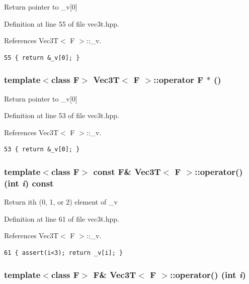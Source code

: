 Return pointer to \_\-v[0] 

Definition at line 55 of file vec3t.hpp.

References Vec3T$<$ F $>$::\_\-v.

\footnotesize\begin{verbatim}55 { return &_v[0]; }
\end{verbatim}\normalsize 


\subsubsection{\setlength{\rightskip}{0pt plus 5cm}template$<$class F$>$ {\bf Vec3T}$<$ F $>$::operator F $\ast$ ()\hspace{0.3cm}{\tt  [inline]}}\label{classVec3T_ac352e6903287f8c15cc49407e292610_ac352e6903287f8c15cc49407e292610}


Return pointer to \_\-v[0] 

Definition at line 53 of file vec3t.hpp.

References Vec3T$<$ F $>$::\_\-v.

\footnotesize\begin{verbatim}53 { return &_v[0]; }
\end{verbatim}\normalsize 


\subsubsection{\setlength{\rightskip}{0pt plus 5cm}template$<$class F$>$ const F\& {\bf Vec3T}$<$ F $>$::operator() (int {\em i}) const\hspace{0.3cm}{\tt  [inline]}}\label{classVec3T_46442ed0ae535217a90cc5b4b63a1f44_46442ed0ae535217a90cc5b4b63a1f44}


Return ith (0, 1, or 2) element of \_\-v 

Definition at line 61 of file vec3t.hpp.

References Vec3T$<$ F $>$::\_\-v.

\footnotesize\begin{verbatim}61 { assert(i<3); return _v[i]; }
\end{verbatim}\normalsize 


\subsubsection{\setlength{\rightskip}{0pt plus 5cm}template$<$class F$>$ F\& {\bf Vec3T}$<$ F $>$::operator() (int {\em i})\hspace{0.3cm}{\tt  [inline]}}\label{classVec3T_a6859783df5149b240b538ed4f692366_a6859783df5149b240b538ed4f692366}



